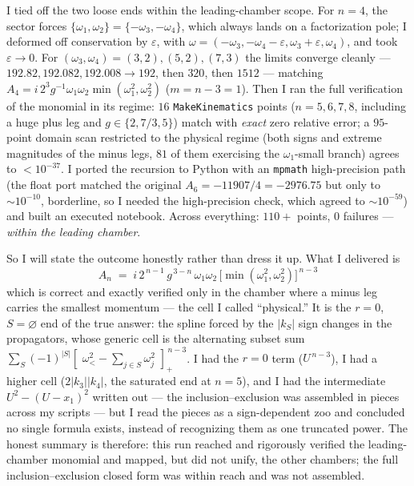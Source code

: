 \documentclass{article}
\newcommand{\pp}[1]{\left[\,#1\,\right]_{+}}
\begin{document}
I tied off the two loose ends within the leading-chamber scope. For $n=4$, the
sector forces $\{\omega_1,\omega_2\}=\{-\omega_3,-\omega_4\}$, which always lands
on a factorization pole; I deformed off conservation by $\varepsilon$, with
$\omega=(-\omega_3,-\omega_4-\varepsilon,\omega_3+\varepsilon,\omega_4)$, and took
$\varepsilon\to0$. For $(\omega_3,\omega_4)=(3,2),(5,2),(7,3)$ the limits
converge cleanly --- $192.82,192.082,192.008\to192$, then $320$, then $1512$ ---
matching $A_4=i\,2^{3}g^{-1}\omega_1\omega_2\min(\omega_1^2,\omega_2^2)$ ($m=n-3=1$).
Then I ran the full verification of the monomial in its regime: $16$
\texttt{MakeKinematics} points ($n=5,6,7,8$, including a huge plus leg and
$g\in\{2,7/3,5\}$) match with \emph{exact} zero relative error; a $95$-point
domain scan restricted to the physical regime (both signs and extreme magnitudes
of the minus legs, $81$ of them exercising the $\omega_1$-small branch) agrees to
$<10^{-37}$. I ported the recursion to Python with an \texttt{mpmath}
high-precision path (the float port matched the original $A_6=-11907/4=-2976.75$
but only to $\sim10^{-10}$, borderline, so I needed the high-precision check,
which agreed to $\sim10^{-59}$) and built an executed notebook. Across everything:
$110+$ points, $0$ failures --- \emph{within the leading chamber}.

So I will state the outcome honestly rather than dress it up. What I delivered is
\[
\boxed{\;
A_n \;=\; i\,2^{\,n-1}\,g^{\,3-n}\,\omega_1\omega_2\,
\big[\min(\omega_1^2,\omega_2^2)\big]^{\,n-3}\;}
\]
which is correct and exactly verified only in the chamber where a minus leg
carries the smallest momentum --- the cell I called ``physical.'' It is the
$r=0$, $S=\varnothing$ end of the true answer: the spline forced by the $|k_S|$
sign changes in the propagators, whose generic cell is the alternating subset sum
$\sum_{S}(-1)^{|S|}\pp{\,\omega_<^2-\sum_{j\in S}\omega_j^2\,}^{\,n-3}$. I had the
$r=0$ term ($U^{\,n-3}$), I had a higher cell ($2|k_3||k_4|$, the saturated end at
$n=5$), and I had the intermediate $U^2-(U-x_1)^2$ written out --- the
inclusion--exclusion was assembled in pieces across my scripts --- but I read the
pieces as a sign-dependent zoo and concluded no single formula exists, instead of
recognizing them as one truncated power. The honest summary is therefore: this run
reached and rigorously verified the leading-chamber monomial and mapped, but did
not unify, the other chambers; the full inclusion--exclusion closed form was
within reach and was not assembled.

\clearpage
\end{document}
